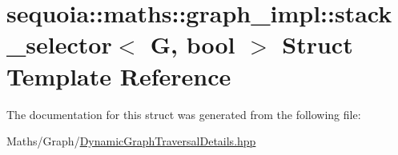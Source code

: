 \hypertarget{structsequoia_1_1maths_1_1graph__impl_1_1stack__selector}{}\section{sequoia\+::maths\+::graph\+\_\+impl\+::stack\+\_\+selector$<$ G, bool $>$ Struct Template Reference}
\label{structsequoia_1_1maths_1_1graph__impl_1_1stack__selector}


The documentation for this struct was generated from the following file\+:\begin{DoxyCompactItemize}
\item 
Maths/\+Graph/\mbox{\hyperlink{_dynamic_graph_traversal_details_8hpp}{Dynamic\+Graph\+Traversal\+Details.\+hpp}}\end{DoxyCompactItemize}
